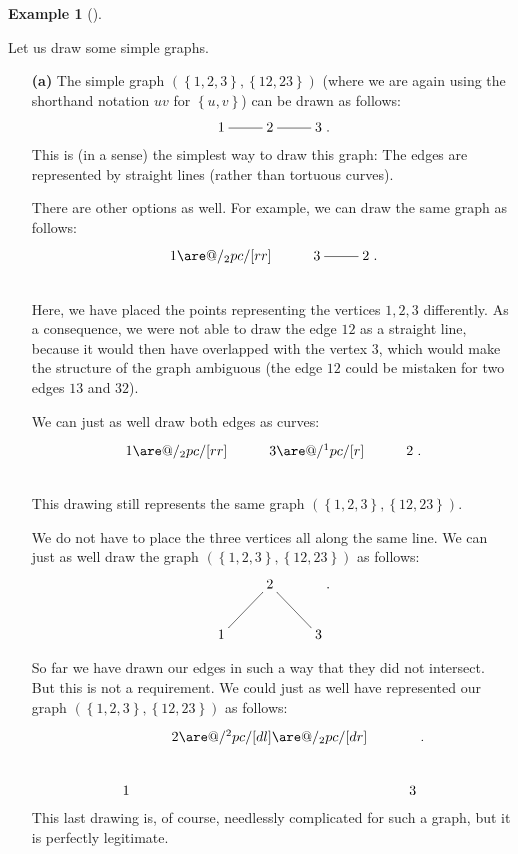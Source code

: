 \documentclass[numbers=enddot,12pt,final,onecolumn,notitlepage]{scrartcl}%
\makeatletter
\theoremstyle{definition}
\newtheorem{exam}[theo]{Example}
\newenvironment{example}[1][]
{\begin{exam}[#1]\begin{leftbar}}
{\end{leftbar}\end{exam}}
\newcommand{\set}[1]{\left\{ #1 \right\}}
\newcommand{\tup}[1]{\left( #1 \right)}
\newcommand{\are}{\ar@{-}}
\makeatother
\begin{document}
\begin{example} \label{exa.intro.draw}
Let us draw some simple graphs.

\begin{enumerate}

\item[\textbf{(a)}]
The simple graph $\tup{\set{1,2,3}, \set{12, 23}}$ (where
we are again using the shorthand notation $uv$ for $\set{u,v}$) can be
drawn as follows:
\[
\xymatrix{ 1 \are[r] & 2 \are[r] & 3 }.
\]
This is (in a sense) the simplest way to draw this graph: The edges
are represented by straight lines (rather than tortuous curves).

There are other options as well. For example, we can draw the same
graph as follows:
\begin{align*}
\xymatrix{ 1 \are@/_2pc/[rr] & 3 \are[r] & 2 }. \\
\phantom{a} %
\end{align*}
Here, we have placed the points representing the vertices $1,2,3$
differently. As a consequence, we were not able to draw the edge $12$
as a straight line, because it would then have overlapped with the
vertex $3$, which would make the structure of the graph ambiguous
(the edge $12$ could be mistaken for two edges $13$ and $32$).

We can just as well draw both edges as curves:
\begin{align*}
\xymatrix{ 1 \are@/_2pc/[rr] & 3 \are@/^1pc/[r] & 2 }. \\
\phantom{a} %
\end{align*}
This drawing still represents the same graph
$\tup{\set{1,2,3}, \set{12, 23}}$.

We do not have to place the three vertices all along the same line.
We can just as well draw the graph $\tup{\set{1,2,3}, \set{12, 23}}$
as follows:
\[
\xymatrix{
& 2 \are[dl] \are[dr] \\
1 & & 3
} .
\]

So far we have drawn our edges in such a way that they did not
intersect. But this is not a requirement. We could just as well have
represented our graph $\tup{\set{1,2,3}, \set{12, 23}}$
as follows:
\[
\xymatrix{
& 2 \are@/^2pc/[dl] \are@/_2pc/[dr] \\
1 & & 3
} .
\]
This last drawing is, of course, needlessly complicated for such a
graph, but it is perfectly legitimate.


\end{enumerate}
\end{example}
\end{document}

